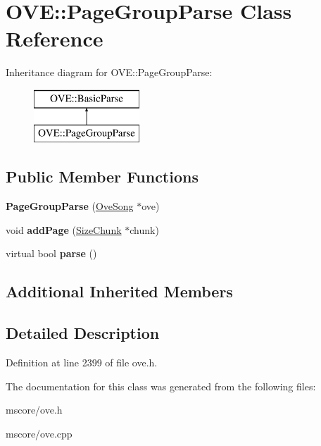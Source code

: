 \hypertarget{class_o_v_e_1_1_page_group_parse}{}\section{O\+VE\+:\+:Page\+Group\+Parse Class Reference}
\label{class_o_v_e_1_1_page_group_parse}
Inheritance diagram for O\+VE\+:\+:Page\+Group\+Parse\+:\begin{figure}[H]
\begin{center}
\leavevmode
\includegraphics[height=2.000000cm]{class_o_v_e_1_1_page_group_parse}
\end{center}
\end{figure}
\subsection*{Public Member Functions}
\begin{DoxyCompactItemize}
\item 
\mbox{\label{class_o_v_e_1_1_page_group_parse_a50f8c38ca73af64588da46d10e118262}} 
{\bfseries Page\+Group\+Parse} (\hyperlink{class_o_v_e_1_1_ove_song}{Ove\+Song} $\ast$ove)
\item 
\mbox{\label{class_o_v_e_1_1_page_group_parse_a58fd0d6f6243f09daffe669769c1d991}} 
void {\bfseries add\+Page} (\hyperlink{class_o_v_e_1_1_size_chunk}{Size\+Chunk} $\ast$chunk)
\item 
\mbox{\label{class_o_v_e_1_1_page_group_parse_ac9fabde042ff0fb12d9c513f92cfb805}} 
virtual bool {\bfseries parse} ()
\end{DoxyCompactItemize}
\subsection*{Additional Inherited Members}


\subsection{Detailed Description}


Definition at line 2399 of file ove.\+h.



The documentation for this class was generated from the following files\+:\begin{DoxyCompactItemize}
\item 
mscore/ove.\+h\item 
mscore/ove.\+cpp\end{DoxyCompactItemize}
